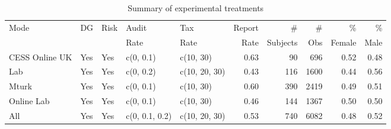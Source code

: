 \begin{table}[H]
\centering
\begingroup\scriptsize
\begin{tabular}{lllllrrrrr}
  \hline
  Mode & DG & Risk & Audit  & Tax  & Report  & \#  & \#  & \%  & \%  \\
 &  &  &  Rate &  Rate &  Rate &  Subjects & Obs & Female &  Male \\
 \hline
CESS Online UK & Yes & Yes & c(0, 0.1) & c(10, 30) & 0.63 &  90 & 696 & 0.52 & 0.48 \\ 
  Lab & Yes & Yes & c(0, 0.2) & c(10, 20, 30) & 0.43 & 116 & 1600 & 0.44 & 0.56 \\ 
  Mturk & Yes & Yes & c(0, 0.1) & c(10, 30) & 0.60 & 390 & 2419 & 0.49 & 0.51 \\ 
  Online Lab & Yes & Yes & c(0, 0.1) & c(10, 30) & 0.46 & 144 & 1367 & 0.50 & 0.50 \\ 
  All & Yes & Yes & c(0, 0.1, 0.2) & c(10, 20, 30) & 0.53 & 740 & 6082 & 0.48 & 0.52 \\ 
   \hline
\end{tabular}
\endgroup
\caption{Summary of experimental treatments} 
\label{tab:sum}
\end{table}
